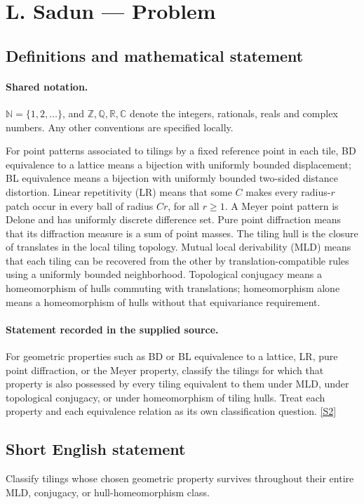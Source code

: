 \documentclass[11pt]{article}
\newcommand{\sref}[2]{\hyperlink{source:#1:#2}{[S#2]}}
\begin{document}
\section{L. Sadun — Problem}\label{statement}

\subsection{Definitions and mathematical statement}

\paragraph{Shared notation.}$\mathbb N=\{1,2,\ldots\}$, and $\mathbb Z,\mathbb Q,\mathbb R,\mathbb C$ denote the integers, rationals, reals and complex numbers. Any other conventions are specified locally.


For point patterns associated to tilings by a fixed reference point in each tile, BD equivalence to a lattice means a bijection with uniformly bounded displacement; BL equivalence means a bijection with uniformly bounded two-sided distance distortion. Linear repetitivity (LR) means that some $C$ makes every radius-$r$ patch occur in every ball of radius $Cr$, for all $r\geq1$. A Meyer point pattern is Delone and has uniformly discrete difference set. Pure point diffraction means that its diffraction measure is a sum of point masses. The tiling hull is the closure of translates in the local tiling topology. Mutual local derivability (MLD) means that each tiling can be recovered from the other by translation-compatible rules using a uniformly bounded neighborhood. Topological conjugacy means a homeomorphism of hulls commuting with translations; homeomorphism alone means a homeomorphism of hulls without that equivariance requirement.
\paragraph{Statement recorded in the supplied source.}
For geometric properties such as BD or BL equivalence to a lattice, LR, pure point diffraction, or the Meyer property, classify the tilings for which that property is also possessed by every tiling equivalent to them under MLD, under topological conjugacy, or under homeomorphism of tiling hulls. Treat each property and each equivalence relation as its own classification question. \sref{statement}{2}
\subsection{Short English statement}
Classify tilings whose chosen geometric property survives throughout their entire MLD, conjugacy, or hull-homeomorphism class.
\end{document}
